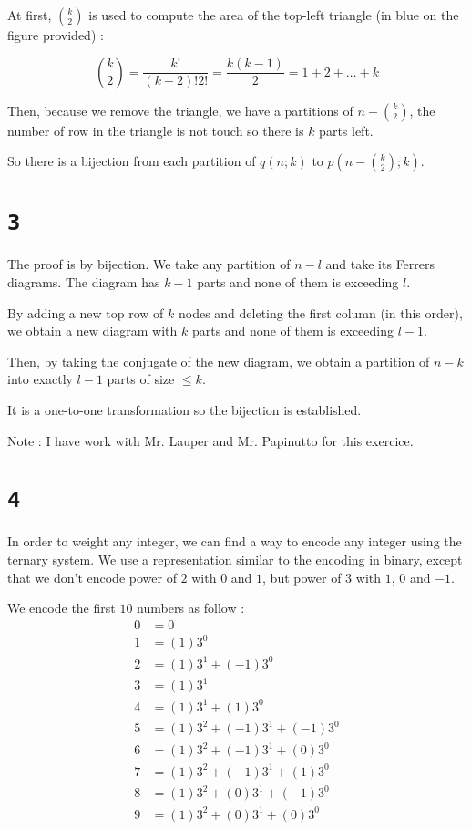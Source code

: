 \documentclass[a4paper,11pt]{report}
\begin{document}
At first, $\binom{k}{2}$ is used to compute the area of the top-left triangle
(in blue on the figure provided) :

\[
  \binom{k}{2} = \frac{k!}{(k-2)!2!} = \frac{k(k-1)}{2} = 1 + 2 + \dots + k
\]

Then, because we remove the triangle, we have a partitions of $n -
\binom{k}{2}$, the number of row in the triangle is not touch so there is $k$
parts left.

So there is a bijection from each partition of $q(n;k)$ to $p(n -
\binom{k}{2};k)$.

\section*{\texttt{3}}

The proof is by bijection. We take any partition of $n-l$ and take its Ferrers
diagrams. The diagram has $k-1$ parts and none of them is exceeding $l$.

By adding a new top row of $k$ nodes and deleting the first column (in this
order), we obtain a new diagram with $k$ parts and none of them is exceeding
$l-1$.

Then, by taking the conjugate of the new diagram, we obtain a partition of $n-k$
into exactly $l-1$ parts of size $\leq k$.

It is a one-to-one transformation so the bijection is established.

Note : I have work with Mr. Lauper and Mr. Papinutto for this exercice.

\section*{\texttt{4}}

In order to weight any integer, we can find a way to encode any integer using
the ternary system. We use a representation similar to the encoding in binary,
except that we don't encode power of $2$ with $0$ and $1$, but power of $3$ with
$1$, $0$ and $-1$.

We encode the first $10$ numbers as follow :
\begin{align*}
  0 &= 0\\
  1 &= (1)3^0\\
  2 &= (1)3^1 + (-1)3^0\\
  3 &= (1)3^1\\
  4 &= (1)3^1 + (1)3^0\\
  5 &= (1)3^2 + (-1)3^1 + (-1)3^0\\
  6 &= (1)3^2 + (-1)3^1 + (0)3^0\\
  7 &= (1)3^2 + (-1)3^1 + (1)3^0\\
  8 &= (1)3^2 + (0)3^1 + (-1)3^0\\
  9 &= (1)3^2 + (0)3^1 + (0)3^0\\
\end{align*}
\end{document}
